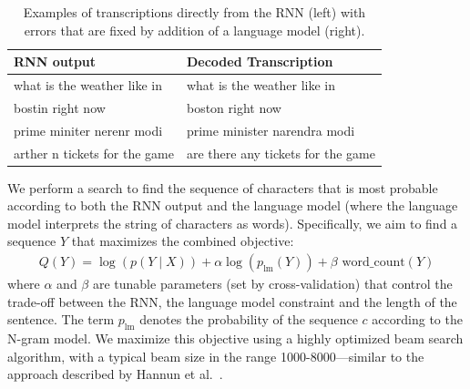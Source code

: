 \begin{table}[h]
\centering
\begin{tabular}{l | l}
\toprule
RNN output  & Decoded Transcription \\
\midrule
\rule{0pt}{2ex}
what is the weather like in & what is the weather like in \\
\rule{0pt}{0.1ex}
bostin right now       & boston right now \\
\rule{0pt}{4ex}
prime miniter nerenr modi   & prime minister narendra modi \\ 
\rule{0pt}{4ex}
arther n tickets for the game  & are there any tickets for the game \\ 
\bottomrule
\end{tabular}
\caption{Examples of transcriptions directly from the RNN (left) with errors
         that are fixed by addition of a language model (right).}
\label{table:deepspeech:max_decoded}
\end{table}

We perform a search to find the sequence of characters that is most probable
according to both the RNN output and the language model (where the language
model interprets the string of characters as words). Specifically, we aim to
find a sequence $Y$ that maximizes the combined objective:
\begin{align*}
    Q(Y) = \log(p(Y \mid X)) + \alpha \log(p_{\text{lm}}(Y)) + \beta \textrm{ word\_count}(Y)
\end{align*}
where $\alpha$ and $\beta$ are tunable parameters (set by cross-validation)
that control the trade-off between the RNN, the language model constraint and
the length of the sentence. The term $p_{\text{lm}}$ denotes the
probability of the sequence $c$ according to the N-gram model. We maximize
this objective using a highly optimized beam search algorithm, with a typical
beam size in the range 1000-8000---similar to the approach described by Hannun
et al.~\cite{hannun2014firstpass}.
